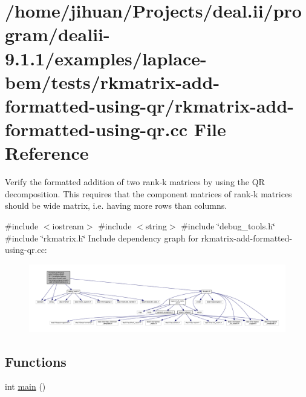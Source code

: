 \hypertarget{rkmatrix-add-formatted-using-qr_8cc}{}\section{/home/jihuan/\+Projects/deal.ii/program/dealii-\/9.1.1/examples/laplace-\/bem/tests/rkmatrix-\/add-\/formatted-\/using-\/qr/rkmatrix-\/add-\/formatted-\/using-\/qr.cc File Reference}
\label{rkmatrix-add-formatted-using-qr_8cc}


Verify the formatted addition of two rank-\/k matrices by using the QR decomposition. This requires that the component matrices of rank-\/k matrices should be wide matrix, i.\+e. having more rows than columns.  


{\ttfamily \#include $<$iostream$>$}\newline
{\ttfamily \#include $<$string$>$}\newline
{\ttfamily \#include \char`\"{}debug\+\_\+tools.\+h\char`\"{}}\newline
{\ttfamily \#include \char`\"{}rkmatrix.\+h\char`\"{}}\newline
Include dependency graph for rkmatrix-\/add-\/formatted-\/using-\/qr.cc\+:
\nopagebreak
\begin{figure}[H]
\begin{center}
\leavevmode
\includegraphics[width=350pt]{rkmatrix-add-formatted-using-qr_8cc__incl}
\end{center}
\end{figure}
\subsection*{Functions}
\begin{DoxyCompactItemize}
\item 
int \hyperlink{rkmatrix-add-formatted-using-qr_8cc_ae66f6b31b5ad750f1fe042a706a4e3d4}{main} ()
\end{DoxyCompactItemize}


